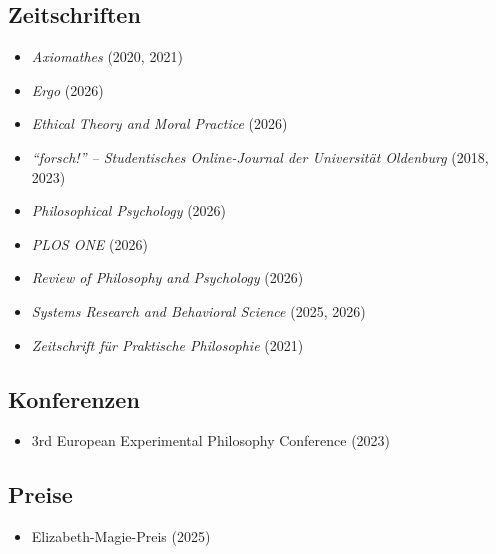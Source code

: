 \documentclass[a4paper,10pt]{article}
\begin{document}
\subsection*{Zeitschriften}
\begin{itemize}
   \item \textit{Axiomathes} (2020, 2021)
   \item \textit{Ergo} (2026)
   \item \textit{Ethical Theory and Moral Practice} (2026)
   \item \textit{\enquote{forsch!} -- Studentisches Online-Journal der Universität Oldenburg} (2018, 2023)
   \item \textit{Philosophical Psychology} (2026)
   \item \textit{PLOS ONE} (2026)
   \item \textit{Review of Philosophy and Psychology} (2026)
   \item \textit{Systems Research and Behavioral Science} (2025, 2026)
   \item \textit{Zeitschrift für Praktische Philosophie} (2021)
\end{itemize}


\subsection*{Konferenzen}
\begin{itemize}
   \item 3rd European Experimental Philosophy Conference (2023)
\end{itemize}


\subsection*{Preise}
\begin{itemize}
   \item Elizabeth-Magie-Preis (2025)
\end{itemize}


\clearpage
\end{document}
